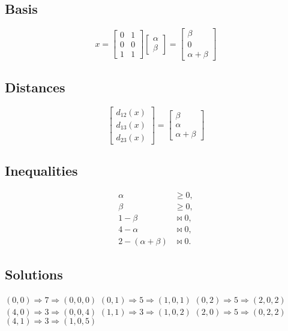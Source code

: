 \documentclass[
  12pt,
  letterpaper,
  DIV=11,
  numbers=noendperiod]{scrartcl}
\begin{document}
\subsection{Basis}\label{basis-2}

\[
x=\begin{bmatrix}
0&1\\
0&0\\
1&1
\end{bmatrix}
\begin{bmatrix}
\alpha\\
\beta
\end{bmatrix}=
\begin{bmatrix}
\beta\\
0\\
\alpha+\beta
\end{bmatrix}
\]

\subsection{Distances}\label{distances-2}

\[
\begin{bmatrix}
d_{12}(x)\\
d_{13}(x)\\
d_{23}(x)
\end{bmatrix}
=\begin{bmatrix}
\beta\\
\alpha\\
\alpha+\beta
\end{bmatrix}
\]

\subsection{Inequalities}\label{inequalities-2}

\begin{align}
\alpha&\geq 0,\\
\beta&\geq 0,\\
1-\beta&\bowtie 0,\\
4-\alpha&\bowtie 0,\\
2-(\alpha+\beta)&\bowtie 0.
\end{align}

\subsection{Solutions}\label{solutions-2}

\((0,0)\Rightarrow 7\Rightarrow(0,0,0)\)\newline
\((0,1)\Rightarrow 5\Rightarrow(1,0,1)\)\newline
\((0,2)\Rightarrow 5\Rightarrow(2,0,2)\)\newline
\((4,0)\Rightarrow 3\Rightarrow(0,0,4)\)\newline
\((1,1)\Rightarrow 3\Rightarrow(1,0,2)\)\newline
\((2,0)\Rightarrow 5\Rightarrow(0,2,2)\)\newline
\((4,1)\Rightarrow 3\Rightarrow(1,0,5)\)\newline
\end{document}
